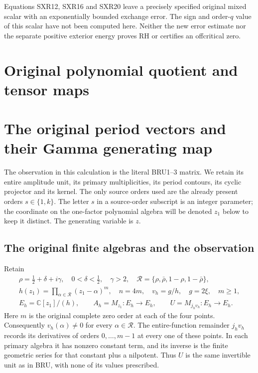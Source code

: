 Equations SXR12, SXR16 and SXR20 leave a precisely specified original
mixed scalar with an exponentially bounded exchange error. The sign
and order-$q$ value of this scalar have not been computed here.
Neither the new error estimate nor the separate positive exterior
energy proves RH or certifies an offcritical zero.
\endgroup
\endgroup

\clearpage
\begingroup


\setcounter{equation}{0}
\renewcommand{\theequation}{OPG.\arabic{equation}}
\section*{Original polynomial quotient and tensor maps}
\section{The original period vectors and their Gamma generating map}
\label{opg:sec:OPG}

The observation in this calculation is the literal BRU1--3 matrix. We
retain its entire amplitude unit, its primary multiplicities, its
period contours, its cyclic projector and its kernel. The only source
orders used are the already present orders $s\in\{1,k\}$. The letter
$s$ in a source-order subscript is an integer parameter; the coordinate
on the one-factor polynomial algebra will be denoted $z_1$ below to
keep it distinct. The generating variable is $z$.

\subsection{The original finite algebras and the observation}
Retain
\[
\begin{gathered}
 \rho=\tfrac12+\delta+i\gamma,\quad 0<\delta<\tfrac12,\quad\gamma>2,
 \quad\mathcal R=\{\rho,\bar\rho,1-\rho,1-\bar\rho\},\\
 h(z_1)=\prod_{\alpha\in\mathcal R}(z_1-\alpha)^m,
 \quad n=4m,\quad v_h=g/h,\quad g=2\xi,\quad m\geq1,\\
 E_h=\mathbb C[z_1]/(h),\qquad A_h=M_{z_1}:E_h\to E_h,
 \qquad U=M_{j_hv_h}:E_h\to E_h.
\end{gathered}\tag{OPG1}
\]
Here $m$ is the original complete zero order at each of the four
points. Consequently $v_h(\alpha)\ne0$ for every $\alpha\in\mathcal R$.
The entire-function remainder $j_hv_h$ records its derivatives of
orders $0,\ldots,m-1$ at every one of these points. In each primary
algebra it has nonzero constant term, and its inverse is the finite
geometric series for that constant plus a nilpotent. Thus $U$ is the
same invertible unit as in BRU, with none of its values prescribed.

